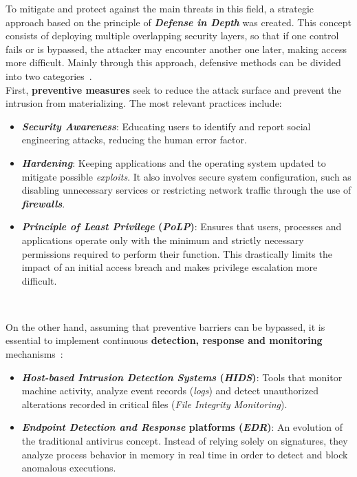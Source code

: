 To mitigate and protect against the main threats in this field, a strategic approach based on the principle of \textbf{\textit{Defense in Depth}} was created.
This concept consists of deploying multiple overlapping security layers, so that if one control fails or is bypassed, the attacker may encounter another one later, making access more difficult.
Mainly through this approach, defensive methods can be divided into two categories~\cite{nist_sec_controls}.\\

First, \textbf{preventive measures} seek to reduce the attack surface and prevent the intrusion from materializing. The most relevant practices include:
\begin{itemize}
    \item \textbf{\textit{Security Awareness}}: Educating users to identify and report social engineering attacks, reducing the human error factor.
    \item \textbf{\textit{Hardening}}: Keeping applications and the operating system updated to mitigate possible \textit{exploits}.
    It also involves secure system configuration, such as disabling unnecessary services or restricting network traffic through the use of \textbf{\textit{firewalls}}.
    \item \textbf{\textit{Principle of Least Privilege} (\textit{PoLP})}: Ensures that users, processes and applications operate only with the minimum and strictly necessary permissions required to perform their function.
    This drastically limits the impact of an initial access breach and makes privilege escalation more difficult.
\end{itemize}

\

On the other hand, assuming that preventive barriers can be bypassed, it is essential to implement continuous \textbf{detection, response and monitoring} mechanisms~\cite{nist_detection}:
\begin{itemize}
    \item \textbf{\textit{Host-based Intrusion Detection Systems} (\textit{HIDS})}: Tools that monitor machine activity, analyze event records (\textit{logs}) and detect unauthorized alterations recorded in critical files (\textit{File Integrity Monitoring}).
    \item \textbf{\textit{Endpoint Detection and Response} platforms (\textit{EDR})}: An evolution of the traditional antivirus concept. Instead of relying solely on signatures, they analyze process behavior in memory in real time in order to detect and block anomalous executions.
\end{itemize}

